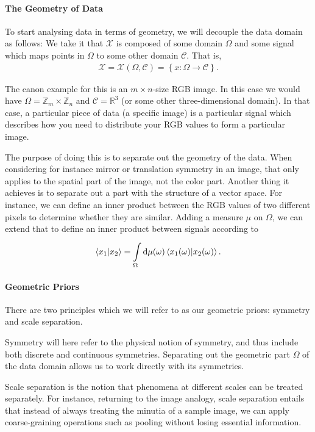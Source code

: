 \paragraph{The Geometry of Data}
To start analysing data in terms of geometry, we will decouple the data domain as follows: We take it that $\mathcal{X}$ is composed of some domain $\Omega$ and some signal which maps points in $\Omega$ to some other domain $\mathcal{C}$. That is,
\begin{align}
  \mathcal{X} = \mathcal{X}(\Omega, \mathcal{C}) = \left\{x: \Omega\to\mathcal{C}\right\}.
\end{align}

The canon example for this is an $m\times n$-size RGB image. In this case we would have $\Omega = \mathbb{Z}_{m}\times\mathbb{Z}_{n}$ and $\mathcal{C} = \mathbb{R}^{3}$ (or some other three-dimensional domain). In that case, a particular piece of data (a specific image) is a particular signal which describes how you need to distribute your RGB values to form a particular image.

The purpose of doing this is to separate out the geometry of the data. When considering for instance mirror or translation symmetry in an image, that only applies to the spatial part of the image, not the color part. Another thing it achieves is to separate out a part with the structure of a vector space. For instance, we can define an inner product between the RGB values of two different pixels to determine whether they are similar. Adding a measure $\mu$ on $\Omega$, we can extend that to define an inner product between signals according to
\begin{align}
  \braket{x_{1}}{x_{2}} = \int\limits_{\Omega}^{}\dd{\mu(\omega)}\braket{x_{1}(\omega)}{x_{2}(\omega)}.
\end{align}

\paragraph{Geometric Priors}
There are two principles which we will refer to as our geometric priors: symmetry and scale separation.

Symmetry will here refer to the physical notion of symmetry, and thus include both discrete and continuous symmetries. Separating out the geometric part $\Omega$ of the data domain allows us to work directly with its symmetries.

Scale separation is the notion that phenomena at different scales can be treated separately. For instance, returning to the image analogy, scale separation entails that instead of always treating the minutia of a sample image, we can apply coarse-graining operations such as pooling without losing essential information.

